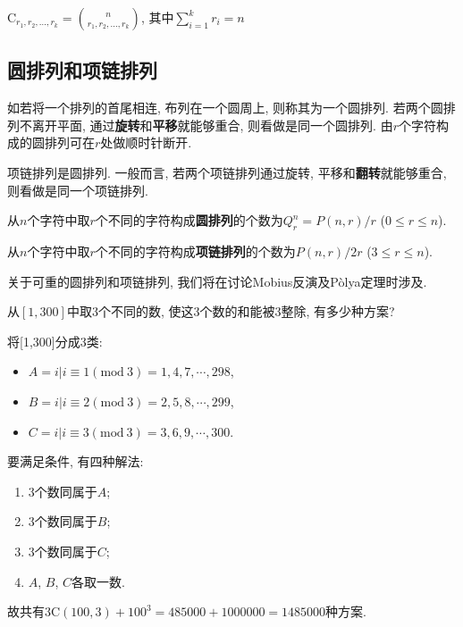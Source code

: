         \begin{theorem}\rm
            $\mathrm{C}_{r_1,r_2,\ldots,r_k}={n\choose r_1,r_2,\ldots,r_k}$, 其中$\sum_{i=1}^kr_i=n$
        \end{theorem}

    \subsection{圆排列和项链排列}

        \begin{definition}[圆排列]
            如若将一个排列的首尾相连, 布列在一个圆周上, 则称其为一个\textsf{圆排列}. 若两个圆排列不离开平面, 通过\textbf{旋转}和\textbf{平移}就能够重合, 则看做是同一个圆排列. 由$r$个字符构成的圆排列可在$r$处做顺时针断开.
        \end{definition}

        \begin{definition}[项链排列]
            \textsf{项链排列}是圆排列. 一般而言, 若两个项链排列通过旋转, 平移和\textbf{翻转}就能够重合, 则看做是同一个项链排列. 
        \end{definition}

        \begin{theorem}\rm
            从$n$个字符中取$r$个不同的字符构成\textbf{圆排列}的个数为$Q^n_r=P(n,r)/r$ ($0\leqslant r\leqslant n$).

            从$n$个字符中取$r$个不同的字符构成\textbf{项链排列}的个数为$P(n,r)/2r$ ($3\leqslant r\leqslant n$).
        \end{theorem}

        关于可重的圆排列和项链排列, 我们将在讨论Mobius反演及P\`olya定理时涉及.

        \begin{example}
            从$[1,300]$中取3个不同的数, 使这3个数的和能被3整除, 有多少种方案? 

            \begin{sol}
                将[1,300]分成3类: 
                \begin{itemize}
                    \item $A={i|i\equiv1(\mathrm{mod\ }3)}={1,4,7,\cdots,298}$,
                    \item $B={i|i\equiv2(\mathrm{mod\ }3)}={2,5,8,\cdots,299}$,
                    \item $C={i|i\equiv3(\mathrm{mod\ }3)}={3,6,9,\cdots,300}$.
                \end{itemize}
                要满足条件, 有四种解法: 
                \begin{enumerate}
                    \item 3个数同属于$A$;
                    \item 3个数同属于$B$;
                    \item 3个数同属于$C$;
                    \item $A$, $B$, $C$各取一数.
                \end{enumerate}
                故共有$3\mathrm{C}(100,3)+100^3=485000+1000000=1485000$种方案.
            \end{sol}
        \end{example}

